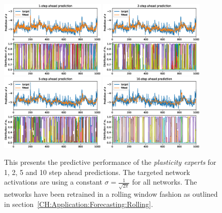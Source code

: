 \begin{figure}
    \begin{center}
        \includegraphics[width=0.45\textwidth]{Plots/Prediction/Plasticity_Constant_rolling_1step.eps}
        \includegraphics[width=0.45\textwidth]{Plots/Prediction/Plasticity_Constant_rolling_2step.eps} \\
        \includegraphics[width=0.45\textwidth]{Plots/Prediction/Plasticity_Constant_rolling_5step.eps}
        \includegraphics[width=0.45\textwidth]{Plots/Prediction/Plasticity_Constant_rolling_10step.eps}
    \end{center}
    \caption{This presents the predictive performance of the \textit{plasticity experts} for 1, 2, 5 and 10 step ahead predictions. The targeted network activations are using a constant $\sigma = \frac{1}{\sqrt{2\pi}}$ for all networks. The networks have been retrained in a rolling window fashion as outlined in section \ref{CH:Application:Forecasting:Rolling}.}
    \label{FIG:PlasticityConstantRolling}
\end{figure}

